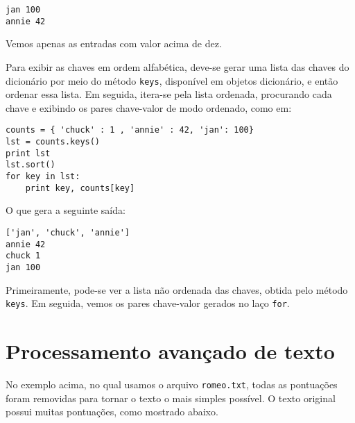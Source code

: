 \beforeverb
\begin{verbatim}
jan 100
annie 42
\end{verbatim}
\afterverb
%
Vemos apenas as entradas com valor acima de dez.


Para exibir as chaves em ordem alfabética, deve-se gerar uma lista das chaves do dicionário por meio do método {\tt keys}, disponível em objetos dicionário, e então ordenar essa lista. Em seguida, itera-se pela lista ordenada, procurando cada chave e exibindo os pares chave-valor de modo ordenado, como em:

\beforeverb
\begin{verbatim}
counts = { 'chuck' : 1 , 'annie' : 42, 'jan': 100}
lst = counts.keys()
print lst
lst.sort()
for key in lst:
    print key, counts[key]
\end{verbatim}
\afterverb
%
O que gera a seguinte saída:

\beforeverb
\begin{verbatim}
['jan', 'chuck', 'annie']
annie 42
chuck 1
jan 100
\end{verbatim}
\afterverb
%
Primeiramente, pode-se ver a lista não ordenada das chaves, obtida pelo método {\tt keys}. Em seguida, vemos os pares chave-valor gerados no laço {\tt for}.

\section{Processamento avançado de texto}


No exemplo acima, no qual usamos o arquivo {\tt romeo.txt}, todas as pontuações foram removidas para tornar o texto o mais simples possível. O texto original possui muitas pontuações, como mostrado abaixo.

